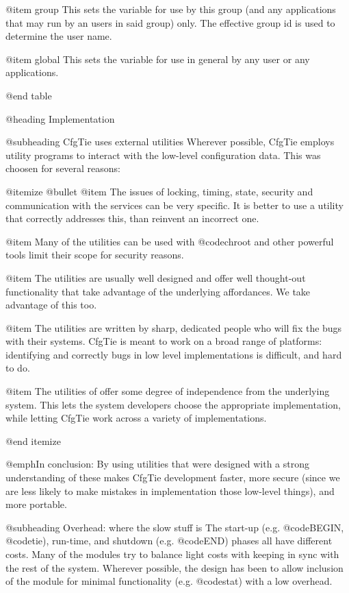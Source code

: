 {{@item group
This sets the variable for use by this group (and any applications that may
run by an users in said group) only.  The effective group id is used to
determine the user name.

@item global
This sets the variable for use in general by any user or any applications.

@end table

@heading Implementation

@subheading CfgTie uses external utilities
Wherever possible, CfgTie employs utility programs to interact with the
low-level configuration data.  This was choosen for several reasons:

@itemize @bullet
@item The issues of locking, timing, state, security and communication with the
services can be very specific.  It is better to use a utility that correctly
addresses this, than reinvent an incorrect one.

@item Many of the utilities can be used with @code{chroot} and other powerful
tools limit their scope for security reasons.

@item The utilities are usually well designed and offer well thought-out
functionality that take advantage of the underlying affordances.  We take
advantage of this too.

@item The utilities are written by sharp, dedicated people who will fix the
bugs with their systems.  CfgTie is meant to work on a broad range of
platforms: identifying and correctly bugs in low level implementations is
difficult, and hard to do. 

@item The utilities of offer some degree of independence from the underlying
system.  This lets the system developers choose the appropriate implementation,
while letting CfgTie work across a variety of implementations.

@end itemize

@emph{In conclusion:} By using utilities that were designed with a strong
understanding of these makes CfgTie development faster, more secure (since we
are less likely to make mistakes in implementation those low-level things), and
more portable.

@subheading Overhead: where the slow stuff is
The start-up (e.g. @code{BEGIN}, @code{tie}), run-time, and shutdown
(e.g. @code{END}) phases all have different costs.  Many of the modules try to
balance light costs with keeping in sync with the rest of the system.
Wherever possible, the design has been to allow inclusion of the module for
minimal functionality (e.g. @code{stat}) with a low overhead.

}}
